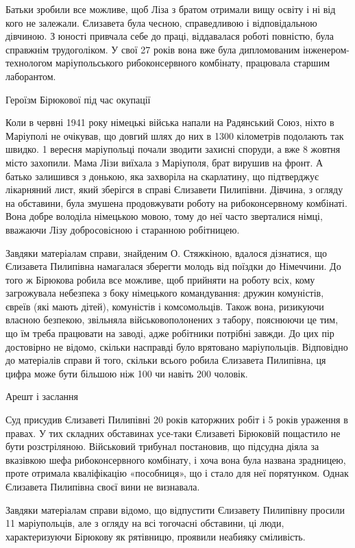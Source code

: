 Батьки зробили все можливе, щоб Ліза з братом отримали вищу освіту і ні від
кого не залежали. Єлизавета була чесною, справедливою і відповідальною
дівчиною. З юності привчала себе до праці, віддавалася роботі повністю, була
справжнім трудоголіком. У свої 27 років вона вже була дипломованим
інженером-технологом маріупольського рибоконсервного комбінату, працювала
старшим лаборантом.

Героїзм Бірюкової під час окупації

Коли в червні 1941 року німецькі війська напали на Радянський Союз, ніхто в
Маріуполі не очікував, що довгий шлях до них в 1300 кілометрів подолають так
швидко. 1 вересня маріупольці почали зводити захисні споруди, а вже 8 жовтня
місто захопили. Мама Лізи виїхала з Маріуполя, брат вирушив на фронт. А батько
залишився з донькою, яка захворіла на скарлатину, що підтверджує лікарняний
лист, який зберігся в справі Єлизавети Пилипівни. Дівчина, з огляду на
обставини, була змушена продовжувати роботу на рибоконсервному комбінаті. Вона
добре володіла німецькою мовою, тому до неї часто зверталися німці, вважаючи
Лізу добросовісною і старанною робітницею.

Завдяки матеріалам справи, знайденим О. Стяжкіною, вдалося дізнатися, що
Єлизавета Пилипівна намагалася зберегти молодь від поїздки до Німеччини. До
того ж Бірюкова робила все можливе, щоб прийняти на роботу всіх, кому
загрожувала небезпека з боку німецького командування: дружин комуністів, євреїв
(які мають дітей), комуністів і комсомольців. Також вона, ризикуючи власною
безпекою, звільняла військовополонених з табору, пояснюючи це тим, що їм треба
працювати на заводі, адже робітники потрібні завжди. До цих пір достовірно не
відомо, скільки насправді було врятовано маріупольців. Відповідно до матеріалів
справи й того, скільки всього робила Єлизавета Пилипівна, ця цифра може бути
більшою ніж 100 чи навіть 200 чоловік.

Арешт і заслання

Суд присудив Єлизаветі Пилипівні 20 років каторжних робіт і 5 років ураження в
правах. У тих складних обставинах усе-таки Єлизаветі Бірюковій пощастило не
бути розстріляною. Військовий трибунал постановив, що підсудна діяла за
вказівкою шефа рибоконсервного комбінату, і хоча вона була названа зрадницею,
проте отримала кваліфікацію «пособниця», що і стало для неї порятунком. Однак
Єлизавета Пилипівна своєї вини не визнавала.

Завдяки матеріалам справи відомо, що відпустити Єлизавету Пилипівну просили 11
маріупольців, але з огляду на всі тогочасні обставини, ці люди, характеризуючи
Бірюкову як рятівницю, проявили неабияку сміливість.

